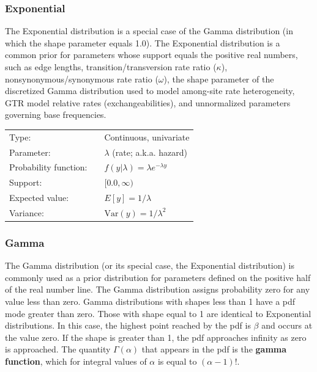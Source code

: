 \documentclass[10pt]{article}
\newcommand{\term}[1]{{\bfseries #1}\index{#1}}	%
\newcommand{\Var}{\mbox{Var}}
\begin{document}
\subsubsection{Exponential}

The Exponential distribution is a special case of the Gamma distribution (in which the shape parameter equals 1.0). The Exponential distribution is a common prior for parameters whose support equals the positive real numbers, such as edge lengths, transition/transversion rate ratio ($\kappa$), nonsynonymous/synonymous rate ratio ($\omega$), the shape parameter of the discretized Gamma distribution used to model among-site rate heterogeneity, GTR model relative rates (exchangeabilities), and unnormalized parameters governing base frequencies.

\begin{tabular}{lcl}
Type:                 & & Continuous, univariate \\
Parameter:            & & $\lambda$ (rate; a.k.a. hazard)    \\
Probability function: & & $f(y|\lambda) = \lambda e^{-\lambda y}$ \\
Support:              & & $[0.0,\infty)$     \\
Expected value:       & & $E[y] = 1/\lambda$ \\
Variance:             & & $\Var(y) = 1/\lambda^2$ 
\end{tabular}

\subsubsection{Gamma}

The Gamma distribution (or its special case, the Exponential distribution) is commonly used as a prior distribution for parameters defined on the positive half of the real number line. The Gamma distribution assigns probability zero for any value less than zero. Gamma distributions with shapes less than 1 have a pdf mode greater than zero. Those with shape equal to 1 are identical to Exponential distributions. In this case, the highest point reached by the pdf is $\beta$ and occurs at the value zero. If the shape is greater than 1, the pdf approaches infinity as zero is approached. The quantity $\Gamma(\alpha)$ that appears in the pdf is the \term{gamma function}, which for integral values of $\alpha$ is equal to $(\alpha-1)!$.
\end{document}
